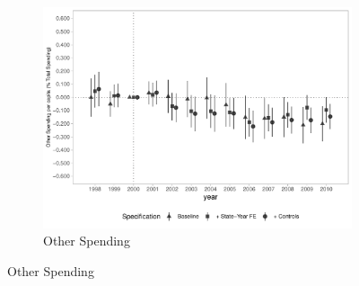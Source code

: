 \begin{figure}[h]
\begin{center}
\begin{subfigure}{0.32\textwidth}
    \end{subfigure}
    \begin{subfigure}{0.32\textwidth}
        \centering
        \caption{\scriptsize Other Spending}\label{fig:finbra2_c}
        \includegraphics[width=\textwidth]{plots/spending/finbra_desp_outros_nature_share_dist_ec29_baseline_dist_ec29_baseline_full.pdf}
    \end{subfigure}
    
    \end{center}
    
\end{figure}




